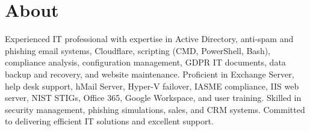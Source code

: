 \documentclass[letterpaper, 10pt]{article}
\begin{document}
	\newpage
	
	\section*{About}
	Experienced IT professional with expertise in Active Directory, anti-spam and
	phishing email systems, Cloudflare, scripting (CMD, PowerShell, Bash), compliance
	analysis, configuration management, GDPR IT documents, data backup and
	recovery, and website maintenance. Proficient in Exchange Server, help desk support,
	hMail Server, Hyper-V failover, IASME compliance, IIS web server, NIST STIGs, Office
	365, Google Workspace, and user training. Skilled in security management, phishing
	simulations, sales, and CRM systems. Committed to delivering efficient IT
	solutions and excellent support.
	
\end{document}
